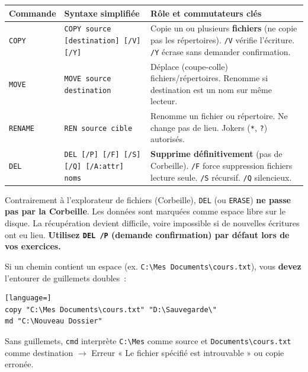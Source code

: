 \documentclass[11pt]{article}
\begin{document}
\begin{propriete}
\begin{center}
\begin{tabularx}{\linewidth}{|l|l|X|}\hline
\textbf{Commande} & \textbf{Syntaxe simplifiée} & \textbf{Rôle et commutateurs clés} \\\hline
\texttt{COPY} & \texttt{COPY source [destination] [/V] [/Y]} & Copie un ou plusieurs \textbf{fichiers} (ne copie pas les répertoires). \texttt{/V} vérifie l'écriture. \texttt{/Y} écrase sans demander confirmation. \\\hline
\texttt{MOVE} & \texttt{MOVE source destination} & Déplace (coupe-colle) fichiers/répertoires. Renomme si destination est un nom sur même lecteur. \\\hline
\texttt{RENAME} & \texttt{REN source cible} & Renomme un fichier ou répertoire. Ne change pas de lieu. Jokers (\texttt{*}, \texttt{?}) autorisés. \\\hline
\texttt{DEL} & \texttt{DEL [/P] [/F] [/S] [/Q] [/A:attr] noms} & \textbf{Supprime définitivement} (pas de Corbeille). \texttt{/F} force suppression fichiers lecture seule. \texttt{/S} récursif. \texttt{/Q} silencieux. \\\hline
\end{tabularx}
\end{center}
\end{propriete}

\begin{attention}[DEL = Suppression définitive immédiate]
Contrairement à l'explorateur de fichiers (Corbeille), \texttt{DEL} (ou \texttt{ERASE}) \textbf{ne passe pas par la Corbeille}. Les données sont marquées comme espace libre sur le disque. La récupération devient difficile, voire impossible si de nouvelles écritures ont eu lieu. \textbf{Utilisez \texttt{DEL /P} (demande confirmation) par défaut lors de vos exercices.}
\end{attention}

\begin{attention}
Si un chemin contient un espace (ex. \texttt{C:\textbackslash Mes Documents\textbackslash cours.txt}), vous \textbf{devez} l'entourer de guillemets doubles~:
\begin{lstlisting}[language=]
copy "C:\Mes Documents\cours.txt" "D:\Sauvegarde\"
md "C:\Nouveau Dossier"
\end{lstlisting}
Sans guillemets, \texttt{cmd} interprète \texttt{C:\textbackslash Mes} comme source et \texttt{Documents\textbackslash cours.txt} comme destination $\rightarrow$ Erreur « Le fichier spécifié est introuvable » ou copie erronée.
\end{attention}
\end{document}
